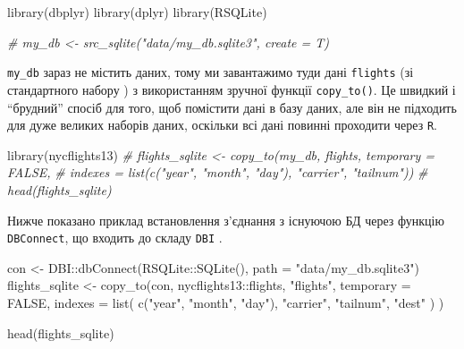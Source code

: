 \documentclass[
]{book}
\newenvironment{Shaded}{\begin{snugshade}}{\end{snugshade}}
\newcommand{\AttributeTok}[1]{\textcolor[rgb]{0.77,0.63,0.00}{#1}}
\newcommand{\CommentTok}[1]{\textcolor[rgb]{0.56,0.35,0.01}{\textit{#1}}}
\newcommand{\ConstantTok}[1]{\textcolor[rgb]{0.00,0.00,0.00}{#1}}
\newcommand{\FunctionTok}[1]{\textcolor[rgb]{0.00,0.00,0.00}{#1}}
\newcommand{\NormalTok}[1]{#1}
\newcommand{\OtherTok}[1]{\textcolor[rgb]{0.56,0.35,0.01}{#1}}
\newcommand{\SpecialCharTok}[1]{\textcolor[rgb]{0.00,0.00,0.00}{#1}}
\newcommand{\StringTok}[1]{\textcolor[rgb]{0.31,0.60,0.02}{#1}}
\begin{document}
\begin{Shaded}
\begin{Highlighting}[]
\FunctionTok{library}\NormalTok{(dbplyr)}
\FunctionTok{library}\NormalTok{(dplyr)}
\FunctionTok{library}\NormalTok{(RSQLite)}
\end{Highlighting}
\end{Shaded}

\begin{Shaded}
\begin{Highlighting}[]
\CommentTok{\# my\_db \textless{}{-} src\_sqlite("data/my\_db.sqlite3", create = T)}
\end{Highlighting}
\end{Shaded}

\texttt{my\_db} зараз не містить даних, тому ми завантажимо туди дані \texttt{flights} (зі стандартного набору \citep{R-nycflights13}) з використанням зручної функції \texttt{copy\_to()}. Це швидкий і ``брудний'' спосіб для того, щоб помістити дані в базу даних, але він не підходить для дуже великих наборів даних, оскільки всі дані повинні проходити через \texttt{R}.

\begin{Shaded}
\begin{Highlighting}[]
\FunctionTok{library}\NormalTok{(nycflights13)}
\CommentTok{\# flights\_sqlite \textless{}{-} copy\_to(my\_db, flights, temporary = FALSE, }
\CommentTok{\#                           indexes = list(c("year", "month", "day"), "carrier", "tailnum"))}
\CommentTok{\# head(flights\_sqlite)}
\end{Highlighting}
\end{Shaded}

Нижче показано приклад встановлення з'єднання з існуючою БД через функцію \texttt{DBConnect}, що входить до складу \texttt{DBI} \citep{R-DBI}.

\begin{Shaded}
\begin{Highlighting}[]
\NormalTok{con }\OtherTok{\textless{}{-}}\NormalTok{ DBI}\SpecialCharTok{::}\FunctionTok{dbConnect}\NormalTok{(RSQLite}\SpecialCharTok{::}\FunctionTok{SQLite}\NormalTok{(), }\AttributeTok{path =} \StringTok{"data/my\_db.sqlite3"}\NormalTok{)}
\NormalTok{flights\_sqlite }\OtherTok{\textless{}{-}} \FunctionTok{copy\_to}\NormalTok{(con, nycflights13}\SpecialCharTok{::}\NormalTok{flights, }\StringTok{"flights"}\NormalTok{,}
        \AttributeTok{temporary =} \ConstantTok{FALSE}\NormalTok{, }
        \AttributeTok{indexes =} \FunctionTok{list}\NormalTok{(}
          \FunctionTok{c}\NormalTok{(}\StringTok{"year"}\NormalTok{, }\StringTok{"month"}\NormalTok{, }\StringTok{"day"}\NormalTok{), }
          \StringTok{"carrier"}\NormalTok{, }
          \StringTok{"tailnum"}\NormalTok{,}
          \StringTok{"dest"}
\NormalTok{        )}
\NormalTok{)}

\FunctionTok{head}\NormalTok{(flights\_sqlite)}
\end{Highlighting}
\end{Shaded}
\end{document}
